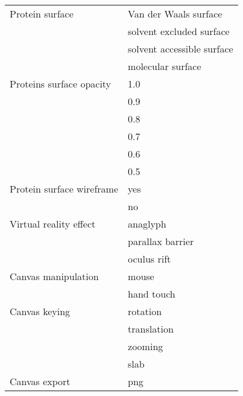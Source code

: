 \documentclass[twocolumn]{bmcart}%
\begin{document}
\begin{backmatter}
\begin{table}[h!]
\begin{tabular}{ll}
        \hline
          Protein surface & Van der Waals surface\\
                          & solvent excluded surface\\
                          & solvent accessible surface\\
                          & molecular surface\\
        \hline
 Proteins surface opacity & 1.0\\
                          & 0.9\\
                          & 0.8\\
                          & 0.7\\
                          & 0.6\\
                          & 0.5\\
        \hline
Protein surface wireframe & yes\\
                          & no\\
        \hline
   Virtual reality effect & anaglyph\\
                          & parallax barrier\\
                          & oculus rift\\
        \hline
      Canvas manipulation & mouse\\
                          & hand touch\\
        \hline
            Canvas keying & rotation\\
                          & translation\\
                          & zooming\\
                          & slab\\
        \hline
            Canvas export & png\\
        \hline
      \end{tabular}
\end{table}




\end{backmatter}
\end{document}
